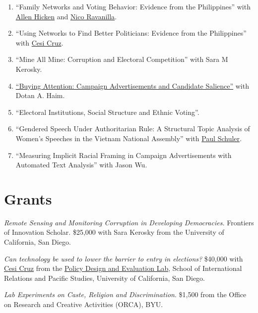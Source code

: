 \documentclass[letterpaper]{article}
\renewenvironment{itemize}{
  \begin{list}{}{
    \setlength{\leftmargin}{1.5em}
  }
}{
  \end{list}
}
\begin{document}
\begin{enumerate}
\item ``Family Networks and Voting Behavior: Evidence from the Philippines'' with \href{http://www.allenhicken.com/}{Allen Hicken} and \href{http://www.nicoravanilla.com/}{Nico Ravanilla}.

\item ``Using Networks to Find Better Politicians: Evidence from the Philippines'' with \href{http://cesicruz.com/}{Cesi Cruz}.

\item ``Mine All Mine: Corruption and Electoral Competition'' with Sara M Kerosky.

\item \href{http://polisci2.ucsd.edu/mwdavidson/Davidson-Haim_Buying%20Attention-Campaign%20Advertisements%20and%20Candidate%20Salience.pdf}{``Buying Attention: Campaign Advertisements and Candidate Salience''} with Dotan A. Haim.

\item ``Electoral Institutions, Social Structure and Ethnic Voting''.

\item ``Gendered Speech Under Authoritarian Rule: A Structural Topic Analysis of Women's Speeches in the Vietnam National Assembly'' with \href{http://polisci2.ucsd.edu/pschuler/}{Paul Schuler}.

\item ``Measuring Implicit Racial Framing in Campaign Advertisements with Automated Text Analysis'' with Jason Wu.
\end{enumerate}

\section*{Grants}
\begin{itemize}
\item \emph{Remote Sensing and Monitoring Corruption in Developing Democracies.} Frontiers of Innovation Scholar. \$25,000 with Sara Kerosky from the University of California, San Diego. 

\item \emph{Can technology be used to lower the barrier to entry in
    elections?} \$40,000 with \href{http://cesicruz.com/}{Cesi Cruz} from the \href{http://pdel.ucsd.edu/}{Policy Design and Evaluation Lab}, School of International
  Relations and Pacific Studies, University of California, San Diego.

\item \emph{Lab Experiments on Caste, Religion and Discrimination}. \$1,500 from the Office on Research and Creative Activities (ORCA), BYU.   
\end{itemize}
\end{document}
